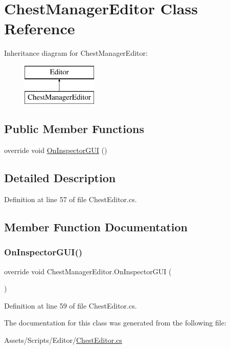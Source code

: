 \hypertarget{class_chest_manager_editor}{}\section{Chest\+Manager\+Editor Class Reference}
\label{class_chest_manager_editor}
Inheritance diagram for Chest\+Manager\+Editor\+:\begin{figure}[H]
\begin{center}
\leavevmode
\includegraphics[height=2.000000cm]{class_chest_manager_editor}
\end{center}
\end{figure}
\subsection*{Public Member Functions}
\begin{DoxyCompactItemize}
\item 
override void \mbox{\hyperlink{class_chest_manager_editor_aaa36f38d47891cf6143e93d5d8ef2e73}{On\+Inspector\+G\+UI}} ()
\end{DoxyCompactItemize}


\subsection{Detailed Description}


Definition at line 57 of file Chest\+Editor.\+cs.



\subsection{Member Function Documentation}
\mbox{\label{class_chest_manager_editor_aaa36f38d47891cf6143e93d5d8ef2e73}} 
\subsubsection{\texorpdfstring{On\+Inspector\+G\+U\+I()}{OnInspectorGUI()}}
{\footnotesize\ttfamily override void Chest\+Manager\+Editor.\+On\+Inspector\+G\+UI (\begin{DoxyParamCaption}{ }\end{DoxyParamCaption})}



Definition at line 59 of file Chest\+Editor.\+cs.



The documentation for this class was generated from the following file\+:\begin{DoxyCompactItemize}
\item 
Assets/\+Scripts/\+Editor/\mbox{\hyperlink{_chest_editor_8cs}{Chest\+Editor.\+cs}}\end{DoxyCompactItemize}
